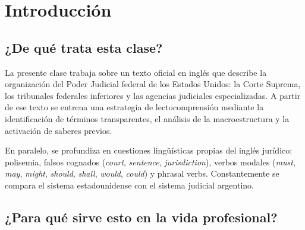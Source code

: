 \documentclass[12pt,oneside]{book}
\begin{document}
\chapter*{Introducción}

\section*{¿De qué trata esta clase?}

La presente clase trabaja sobre un texto oficial en inglés que describe la organización del Poder Judicial federal de los Estados Unidos: la Corte Suprema, los tribunales federales inferiores y las agencias judiciales especializadas. A partir de ese texto se entrena una estrategia de lectocomprensión mediante la identificación de términos transparentes, el análisis de la macroestructura y la activación de saberes previos.

En paralelo, se profundiza en cuestiones lingüísticas propias del inglés jurídico: polisemia, falsos cognados (\textit{court}, \textit{sentence}, \textit{jurisdiction}), verbos modales (\textit{must}, \textit{may}, \textit{might}, \textit{should}, \textit{shall}, \textit{would}, \textit{could}) y phrasal verbs. Constantemente se compara el sistema estadounidense con el sistema judicial argentino.

\section*{¿Para qué sirve esto en la vida profesional?}
\end{document}
